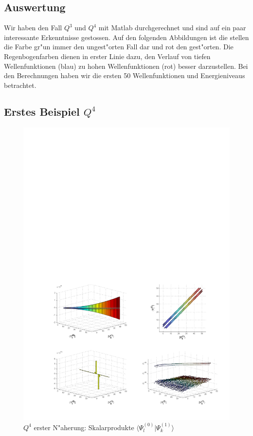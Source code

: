 \begin{refsection}
\section{Auswertung}

Wir haben den Fall $Q^3$ und $Q^4$ mit Matlab durchgerechnet und sind auf
ein paar interessante Erkenntnisse gestossen.
Auf den folgenden Abbildungen ist die stellen die Farbe gr"un
immer den ungest"orten Fall dar und rot den gest"orten.
Die Regenbogenfarben dienen in erster Linie dazu, den Verlauf von
tiefen Wellenfunktionen (blau) zu hohen Wellenfunktionen (rot) besser darzustellen.
Bei den Berechnungen haben wir die ersten 50 Wellenfunktionen und Energieniveaus
betrachtet.

\subsection{Erstes Beispiel $Q^4$}

\begin{figure}	%
\centering
\includegraphics[width=1.0\textwidth]{anharmonisch/images/x4/Stoerung1Skalare.pdf}
\caption{$Q^4$ erster N"aherung: Skalarprodukte $\langle\Psi_l^{(0)}|\Psi_k^{(1)}\rangle$
\label{skript:x4_Stoerung1Skalare}}
\end{figure}


\end{refsection}
